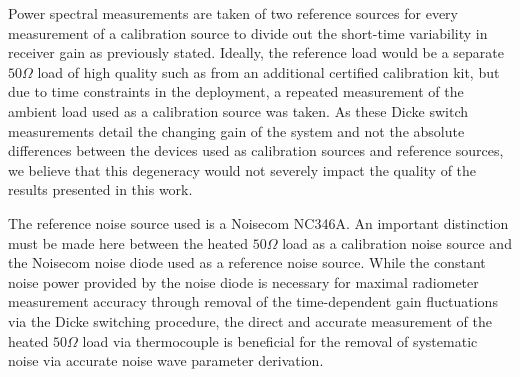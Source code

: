 Power spectral measurements are taken of two reference sources for every measurement of a calibration source to divide out the short-time variability in receiver gain as previously stated. Ideally, the reference load would be a separate $50 \Omega$ load of high quality such as from an additional certified calibration kit, but due to time constraints in the deployment, a repeated measurement of the ambient load used as a calibration source was taken. As these Dicke switch measurements detail the changing gain of the system and not the absolute differences between the devices used as calibration sources and reference sources, we believe that this degeneracy would not severely impact the quality of the results presented in this work.

The reference noise source used is a Noisecom NC346A. An important distinction must be made here between the heated $50 \Omega$ load as a calibration noise source and the Noisecom noise diode used as a reference noise source. While the constant noise power provided by the noise diode is necessary for maximal radiometer measurement accuracy through removal of the time-dependent gain fluctuations via the Dicke switching procedure, the direct and accurate measurement of the heated $50 \Omega$ load via thermocouple is beneficial for the removal of systematic noise via accurate noise wave parameter derivation. 

